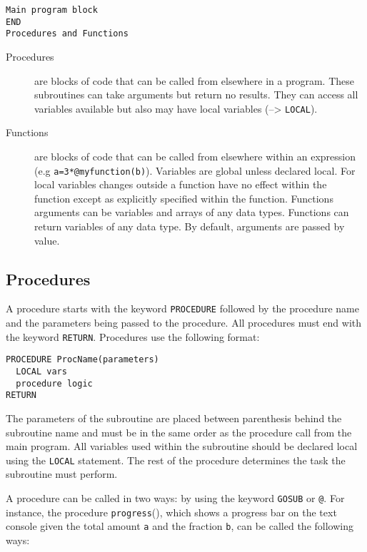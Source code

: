 \begin{verbatim}
Main program block
END
Procedures and Functions
\end{verbatim}


\begin{description}
\item[Procedures] are blocks of code that can be called from elsewhere in a
	program. These subroutines can take arguments but return no results. They
	can access all variables available but also may have local variables
	(--> \verb|LOCAL|).

\item[Functions] are blocks of code that can be called from elsewhere within 
	an expression (e.g \verb|a=3*@myfunction(b)|). Variables are global
	unless declared local. For local variables changes outside a function
	have no effect within the function except as explicitly specified
	within the function. Functions arguments can be variables and arrays
	of any data types. Functions can return variables of any data type. By
	default, arguments are passed by value. 
\end{description}

\subsection{Procedures}

A procedure starts with the keyword \verb|PROCEDURE| followed by the procedure
name and the parameters being passed to the procedure. All procedures must
end with the keyword \verb|RETURN|. Procedures use the following format:

\begin{verbatim}
PROCEDURE ProcName(parameters)
  LOCAL vars
  procedure logic
RETURN
\end{verbatim}

The parameters of the subroutine are placed between parenthesis behind the
subroutine name and must be in the same order as the procedure call from
the main program. All variables used within the subroutine should be
declared local using the \verb|LOCAL| statement. The rest of the procedure
determines the task the subroutine must perform.

A procedure can be called in two ways: by using the keyword  \verb|GOSUB| or
\verb|@|. For instance, the procedure \verb|progress|(), which shows a progress
bar on the text console given the total amount \verb|a| and the  fraction
\verb|b|, can be  called the following ways:


